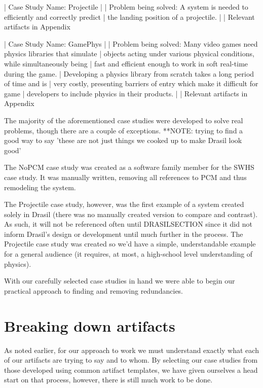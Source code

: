  | Case Study Name: Projectile
 | 
 | Problem being solved: A system is needed to efficiently and correctly predict
 | the landing position of a projectile.
 | 
 | Relevant artifacts in Appendix %
 
 | Case Study Name: GamePhys
 | 
 | Problem being solved: Many video games need physics libraries that simulate 
 | objects acting under various physical conditions, while simultaneously being 
 | fast and efficient enough to work in soft real-time during the game. 
 | Developing a physics library from scratch takes a long period of time and is 
 | very costly, presenting barriers of entry which make it difficult for game 
 | developers to include physics in their products.
 | 
 | Relevant artifacts in Appendix %

The majority of the aforementioned case studies were developed to solve real
problems, though there are a couple of exceptions.
  **NOTE: trying to find a good way to say 'these are not just things we cooked
    up to make Drasil look good'
    
The NoPCM case study was created as a software family member for the SWHS case
study. It was manually written, removing all references to PCM and thus 
remodeling the system.

The Projectile case study, however, was the first example of a system created
solely in Drasil (there was no manually created version to compare and 
contrast). As such, it will not be referenced often until DRASILSECTION since
it did not inform Drasil's design or development until much further in the 
process. The Projectile case study was created so we'd have a simple, 
understandable example for a general audience (it requires, at most, a 
high-school level understanding of physics). 

With our carefully selected case studies in hand we were able to begin our 
practical approach to finding and removing redundancies.

\section{Breaking down artifacts}
As noted earlier, for our approach to work we must understand exactly what each
of our artifacts are trying to say and to whom. By selecting our case studies 
from those developed using common artifact templates, we have given ourselves a
head start on that process, however, there is still much work to be done.

